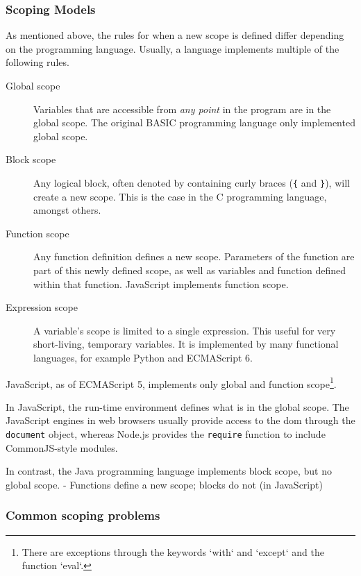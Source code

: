 \subsubsection{Scoping Models}\label{scoping-models}

As mentioned above, the rules for when a new scope is defined differ
depending on the programming language. Usually, a language implements
multiple of the following rules.

\begin{description}
\item[Global scope]
Variables that are accessible from \emph{any point} in the program are
in the global scope. The original BASIC programming language only
implemented global scope.
\item[Block scope]
Any logical block, often denoted by containing curly braces (\texttt{\{}
and \texttt{\}}), will create a new scope. This is the case in the C
programming language, amongst others.
\item[Function scope]
Any function definition defines a new scope. Parameters of the function
are part of this newly defined scope, as well as variables and function
defined within that function. JavaScript implements function scope.
\item[Expression scope]
A variable’s scope is limited to a single expression. This useful for
very short-living, temporary variables. It is implemented by many
functional languages, for example Python and ECMAScript 6.
\end{description}

JavaScript, as of ECMAScript 5, implements only global and function
scope\footnote{There are exceptions through the keywords `with` and `except` and the function `eval`.}.

In JavaScript, the run-time environment defines what is in the global
scope. The JavaScript engines in web browsers usually provide access to
the \ac{dom} through the \texttt{document} object, whereas Node.js
provides the \texttt{require} function to include CommonJS-style
modules.

In contrast, the Java programming language implements block scope, but
no global scope. - Functions define a new scope; blocks do not (in
JavaScript)

\subsubsection{Common scoping problems}\label{common-scoping-problems}

